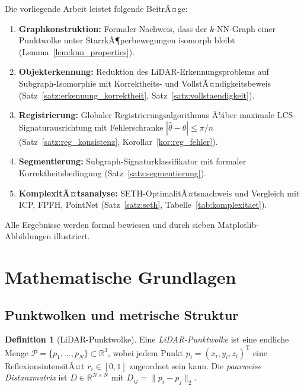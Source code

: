 ﻿\documentclass[a4paper,12pt]{article}
\theoremstyle{definition}
\newtheorem{definition}{Definition}[section]
\begin{document}
Die vorliegende Arbeit leistet folgende BeitrÃ¤ge:
\begin{enumerate}
  \item \textbf{Graphkonstruktion:} Formaler Nachweis, dass der
        $k$-NN-Graph einer Punktwolke unter StarrkÃ¶perbewegungen
        isomorph bleibt (Lemma~\ref{lem:knn_properties}).
  \item \textbf{Objekterkennung:} Reduktion des LiDAR-Erkennungsproblems
        auf Subgraph-Isomorphie mit Korrektheits- und VollstÃ¤ndigkeitsbeweis
        (Satz~\ref{satz:erkennung_korrektheit},
        Satz~\ref{satz:vollstaendigkeit}).
  \item \textbf{Registrierung:} Globaler Registrierungsalgorithmus Ã¼ber
        maximale LCS-Signaturausrichtung mit Fehlerschranke
        $|\hat\theta - \theta| \leq \pi/n$
        (Satz~\ref{satz:reg_konsistenz}, Korollar~\ref{kor:reg_fehler}).
  \item \textbf{Segmentierung:} Subgraph-Signaturklassifikator mit
        formaler Korrektheitsbedingung
        (Satz~\ref{satz:segmentierung}).
  \item \textbf{KomplexitÃ¤tsanalyse:} SETH-OptimalitÃ¤tsnachweis und
        Vergleich mit ICP, FPFH, PointNet
        (Satz~\ref{satz:seth}, Tabelle~\ref{tab:komplexitaet}).
\end{enumerate}

Alle Ergebnisse werden formal bewiesen und durch sieben
Matplotlib-Abbildungen illustriert.

\section{Mathematische Grundlagen}

\subsection{Punktwolken und metrische Struktur}

\begin{definition}[LiDAR-Punktwolke]
  \label{def:punktwolke}
  Eine \emph{LiDAR-Punktwolke} ist eine endliche Menge
  $\mathcal{P} = \{p_1, \ldots, p_N\} \subset \mathbb{R}^3$,
  wobei jedem Punkt $p_i = (x_i, y_i, z_i)^{\mathrm{T}}$ eine
  ReflexionsintensitÃ¤t $r_i \in [0,1]$ zugeordnet sein kann.
  Die \emph{paarweise Distanzmatrix} ist
  $D \in \mathbb{R}^{N \times N}$ mit $D_{ij} = \|p_i - p_j\|_2$.
\end{definition}
\end{document}
